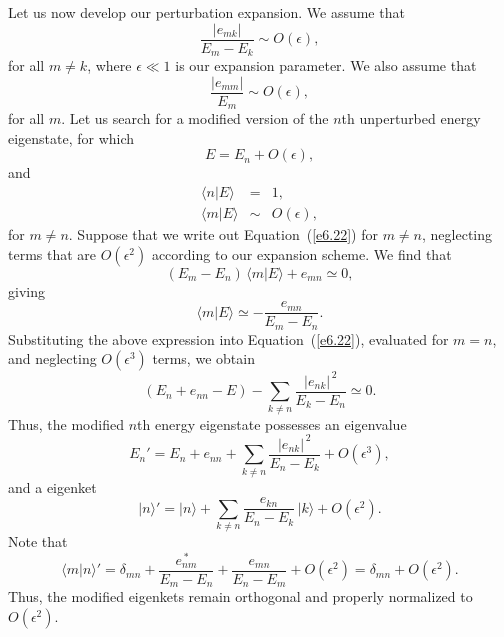 Let us now develop our perturbation expansion. We assume that
\begin{equation}
\frac{|e_{mk}|}{E_m - E_k} \sim O(\epsilon),
\end{equation}
for all $m\neq k$, where $\epsilon\ll 1$ is our expansion parameter. We also
assume that
\begin{equation}
\frac{|e_{mm}|}{E_m} \sim O(\epsilon),
\end{equation} 
for all $m$. Let us search for a modified version of the $n$th unperturbed energy
eigenstate, for which
\begin{equation}
E= E_n + O(\epsilon),
\end{equation}
and
\begin{eqnarray}
\langle n|E\rangle &=& 1,\\[0.5ex]
\langle m|E\rangle &\sim& O(\epsilon),
\end{eqnarray}
for $m\neq n$. Suppose that we 
write out Equation~(\ref{e6.22}) for $m\neq n$, neglecting terms that 
are $O(\epsilon^2)$ according to our expansion scheme. We find that
\begin{equation}
(E_m - E_n) \,\langle m |E \rangle + e_{mn} \simeq 0,
\end{equation} 
giving 
\begin{equation}
\langle m|E\rangle \simeq -\frac{e_{mn}}{E_m - E_n}.
\end{equation}
Substituting the above expression into Equation~(\ref{e6.22}),
evaluated  for $m=n$, and neglecting $O(\epsilon^3)$ terms, we obtain
\begin{equation}
(E_n + e_{nn} - E)  - \sum_{k\neq n} \frac{|e_{nk}|^{\,2}}
{E_k-E_n} \simeq 0.
\end{equation}
Thus, the modified $n$th energy eigenstate possesses an  eigenvalue
\begin{equation}\label{e6.32}
E_n' = E_n + e_{nn} +  \sum_{k\neq n} \frac{|e_{nk}|^{\,2}}
{E_n-E_k} + O(\epsilon^3),
\end{equation}
and a eigenket
\begin{equation}\label{e6.33}
|n\rangle' = |n\rangle   +\sum_{k\neq n}\frac{e_{kn}}{E_n - E_k}\,|k\rangle + O(\epsilon^2).
\end{equation}
Note that
\begin{equation}
\langle m|n\rangle' = \delta_{mn} + \frac{e_{nm}^{\,\ast}}{E_m-E_n} + \frac{e_{mn}}
{E_n-E_m} + O(\epsilon^2) = \delta_{mn} + O(\epsilon^2).
\end{equation}
Thus, the modified eigenkets remain  orthogonal and properly normalized
to $O(\epsilon^2)$. 

